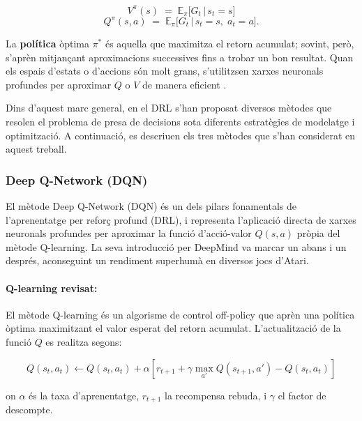 \documentclass[12pt,a4paper,twoside]{book}
\begin{document}
\begin{equation}
V^\pi(s) \;=\; \mathbb{E}_\pi\bigl[G_t \,\big\vert\, s_t = s\bigr]
\end{equation}
\begin{equation}
Q^\pi(s,a) \;=\; \mathbb{E}_\pi\bigl[G_t \,\big\vert\, s_t = s,\; a_t = a\bigr].
\end{equation}

La \textbf{política} òptima $\pi^*$ és aquella que maximitza el retorn acumulat; sovint, però, s'aprèn mitjançant aproximacions successives fins a trobar un bon resultat. Quan els espais d'estats o d'accions són molt grans, s'utilitzsen xarxes neuronals profundes per aproximar $Q$ o $V$ de manera eficient \cite{MnihNature2015}.

\vspace{2ex}
Dins d'aquest marc general, en el DRL s'han proposat diversos mètodes que resolen el problema de presa de decisions sota diferents estratègies de modelatge i optimització. A continuació, es descriuen els tres mètodes que s'han considerat en aquest treball.

\subsubsection{Deep Q-Network (DQN)}

El mètode Deep Q-Network (DQN) és un dels pilars fonamentals de l'aprenentatge per reforç profund (DRL), i representa l'aplicació directa de xarxes neuronals profundes per aproximar la funció d'acció-valor $Q(s, a)$ pròpia del mètode Q-learning. La seva introducció per DeepMind \cite{MnihNature2015} va marcar un abans i un després, aconseguint un rendiment superhumà en diversos jocs d'Atari.

\paragraph{Q-learning revisat:}

El mètode Q-learning és un algorisme de control off-policy que aprèn una política òptima maximitzant el valor esperat del retorn acumulat. L'actualització de la funció $Q$ es realitza segons:

\begin{equation}
Q(s_t, a_t) \leftarrow Q(s_t, a_t) + \alpha \left[ r_{t+1} + \gamma \max_{a'} Q(s_{t+1}, a') - Q(s_t, a_t) \right]
\end{equation}

on $\alpha$ és la taxa d'aprenentatge, $r_{t+1}$ la recompensa rebuda, i $\gamma$ el factor de descompte.
\end{document}
